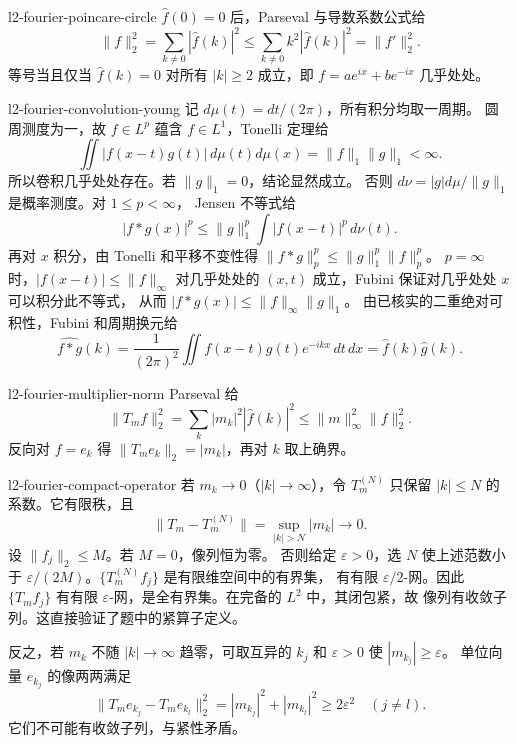 \begin{solution}{l2-fourier-poincare-circle}
\(\widehat f(0)=0\) 后，Parseval 与导数系数公式给
\[
 \|f\|_2^2=\sum_{k\ne0}|\widehat f(k)|^2
 \le\sum_{k\ne0}k^2|\widehat f(k)|^2=\|f'\|_2^2.
\]
等号当且仅当 \(\widehat f(k)=0\) 对所有 \(|k|\ge2\) 成立，即
\(f=a e^{ix}+b e^{-ix}\) 几乎处处。
\end{solution}

\begin{solution}{l2-fourier-convolution-young}
记 \(d\mu(t)=dt/(2\pi)\)，所有积分均取一周期。
圆周测度为一，故 \(f\in L^p\) 蕴含 \(f\in L^1\)，Tonelli 定理给
\[
 \iint |f(x-t)g(t)|\,d\mu(t)d\mu(x)=\|f\|_1\|g\|_1<\infty.
\]
所以卷积几乎处处存在。若 \(\|g\|_1=0\)，结论显然成立。
否则 \(d\nu=|g|d\mu/\|g\|_1\) 是概率测度。对 \(1\le p<\infty\)，
Jensen 不等式给
\[
 |f*g(x)|^p\le\|g\|_1^p\int |f(x-t)|^p\,d\nu(t).
\]
再对 \(x\) 积分，由 Tonelli 和平移不变性得
\(\|f*g\|_p^p\le\|g\|_1^p\|f\|_p^p\)。
\(p=\infty\) 时，\(|f(x-t)|\le\|f\|_\infty\) 对几乎处处的
\((x,t)\) 成立，Fubini 保证对几乎处处 \(x\) 可以积分此不等式，
从而 \(|f*g(x)|\le\|f\|_\infty\|g\|_1\)。
由已核实的二重绝对可积性，Fubini 和周期换元给
\[
 \widehat{f*g}(k)
 =\frac1{(2\pi)^2}\iint f(x-t)g(t)e^{-ikx}\,dt\,dx
 =\widehat f(k)\widehat g(k).
\]
\end{solution}

\begin{solution}{l2-fourier-multiplier-norm}
Parseval 给
\[
 \|T_mf\|_2^2=\sum_k|m_k|^2|\widehat f(k)|^2
 \le\|m\|_\infty^2\|f\|_2^2.
\]
反向对 \(f=e_k\) 得 \(\|T_me_k\|_2=|m_k|\)，再对 \(k\) 取上确界。
\end{solution}

\begin{solution}{l2-fourier-compact-operator}
若 \(m_k\to0\)（\(|k|\to\infty\)），令 \(T_m^{(N)}\) 只保留
\(|k|\le N\) 的系数。它有限秩，且
\[
 \|T_m-T_m^{(N)}\|=\sup_{|k|>N}|m_k|\to0.
\]
设 \(\|f_j\|_2\le M\)。若 \(M=0\)，像列恒为零。
否则给定 \(\varepsilon>0\)，选 \(N\) 使上述范数小于
\(\varepsilon/(2M)\)。\(\{T_m^{(N)}f_j\}\) 是有限维空间中的有界集，
有有限 \(\varepsilon/2\)-网。因此 \(\{T_mf_j\}\) 有有限
\(\varepsilon\)-网，是全有界集。在完备的 \(L^2\) 中，其闭包紧，故
像列有收敛子列。这直接验证了题中的紧算子定义。

反之，若 \(m_k\) 不随 \(|k|\to\infty\) 趋零，可取互异的
\(k_j\) 和 \(\varepsilon>0\) 使 \(|m_{k_j}|\ge\varepsilon\)。
单位向量 \(e_{k_j}\) 的像两两满足
\[
 \|T_me_{k_j}-T_me_{k_l}\|_2^2
 =|m_{k_j}|^2+|m_{k_l}|^2\ge2\varepsilon^2\quad(j\ne l).
\]
它们不可能有收敛子列，与紧性矛盾。
\end{solution}


